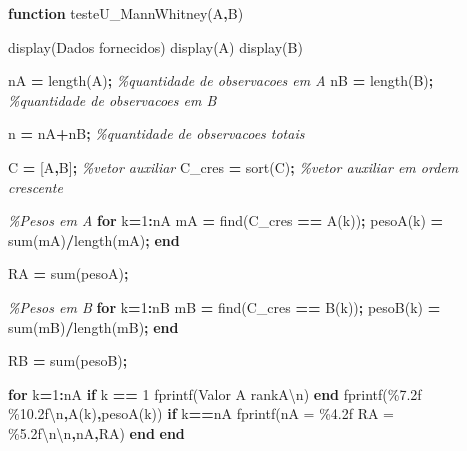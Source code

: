 \documentclass[
]{book}
\newenvironment{Shaded}{\begin{snugshade}}{\end{snugshade}}
\newcommand{\CommentTok}[1]{\textcolor[rgb]{0.56,0.35,0.01}{\textit{#1}}}
\newcommand{\ControlFlowTok}[1]{\textcolor[rgb]{0.13,0.29,0.53}{\textbf{#1}}}
\newcommand{\FloatTok}[1]{\textcolor[rgb]{0.00,0.00,0.81}{#1}}
\newcommand{\FunctionTok}[1]{\textcolor[rgb]{0.00,0.00,0.00}{#1}}
\newcommand{\NormalTok}[1]{#1}
\newcommand{\OperatorTok}[1]{\textcolor[rgb]{0.81,0.36,0.00}{\textbf{#1}}}
\newcommand{\StringTok}[1]{\textcolor[rgb]{0.31,0.60,0.02}{#1}}
\begin{document}
\begin{Shaded}
\begin{Highlighting}[]
\ControlFlowTok{function}\NormalTok{ testeU\_MannWhitney(A}\OperatorTok{,}\NormalTok{B)}

\FunctionTok{display}\NormalTok{(}\StringTok{\textquotesingle{}Dados fornecidos\textquotesingle{}}\NormalTok{)}
\FunctionTok{display}\NormalTok{(A)}
\FunctionTok{display}\NormalTok{(B)}

\NormalTok{nA }\OperatorTok{=} \FunctionTok{length}\NormalTok{(A)}\OperatorTok{;}   \CommentTok{\%quantidade de observacoes em A}
\NormalTok{nB }\OperatorTok{=} \FunctionTok{length}\NormalTok{(B)}\OperatorTok{;}   \CommentTok{\%quantidade de observacoes em B}

\NormalTok{n }\OperatorTok{=}\NormalTok{ nA}\OperatorTok{+}\NormalTok{nB}\OperatorTok{;}        \CommentTok{\%quantidade de observacoes totais}

\NormalTok{C }\OperatorTok{=}\NormalTok{ [A}\OperatorTok{,}\NormalTok{B]}\OperatorTok{;}        \CommentTok{\%vetor auxiliar}
\NormalTok{C\_cres }\OperatorTok{=} \FunctionTok{sort}\NormalTok{(C)}\OperatorTok{;} \CommentTok{\%vetor auxiliar em ordem crescente}

\CommentTok{\%Pesos em A}
\ControlFlowTok{for}\NormalTok{ k}\OperatorTok{=}\FloatTok{1}\OperatorTok{:}\NormalTok{nA}
\NormalTok{  mA }\OperatorTok{=} \FunctionTok{find}\NormalTok{(C\_cres }\OperatorTok{==}\NormalTok{ A(k))}\OperatorTok{;}
\NormalTok{  pesoA(k) }\OperatorTok{=} \FunctionTok{sum}\NormalTok{(mA)}\OperatorTok{/}\FunctionTok{length}\NormalTok{(mA)}\OperatorTok{;}
\ControlFlowTok{end}

\NormalTok{RA }\OperatorTok{=} \FunctionTok{sum}\NormalTok{(pesoA)}\OperatorTok{;}

\CommentTok{\%Pesos em B}
\ControlFlowTok{for}\NormalTok{ k}\OperatorTok{=}\FloatTok{1}\OperatorTok{:}\NormalTok{nB}
\NormalTok{  mB }\OperatorTok{=} \FunctionTok{find}\NormalTok{(C\_cres }\OperatorTok{==}\NormalTok{ B(k))}\OperatorTok{;}
\NormalTok{  pesoB(k) }\OperatorTok{=} \FunctionTok{sum}\NormalTok{(mB)}\OperatorTok{/}\FunctionTok{length}\NormalTok{(mB)}\OperatorTok{;}
\ControlFlowTok{end}

\NormalTok{RB }\OperatorTok{=} \FunctionTok{sum}\NormalTok{(pesoB)}\OperatorTok{;}

\ControlFlowTok{for}\NormalTok{ k}\OperatorTok{=}\FloatTok{1}\OperatorTok{:}\NormalTok{nA}
  \ControlFlowTok{if}\NormalTok{ k }\OperatorTok{==} \FloatTok{1}
    \FunctionTok{fprintf}\NormalTok{(}\StringTok{\textquotesingle{}Valor A           rankA\textbackslash{}n\textquotesingle{}}\NormalTok{)}
  \ControlFlowTok{end}
  \FunctionTok{fprintf}\NormalTok{(}\StringTok{\textquotesingle{}\%7.2f     \%10.2f\textbackslash{}n\textquotesingle{}}\OperatorTok{,}\NormalTok{A(k)}\OperatorTok{,}\NormalTok{pesoA(k))}
  \ControlFlowTok{if}\NormalTok{ k}\OperatorTok{==}\NormalTok{nA}
    \FunctionTok{fprintf}\NormalTok{(}\StringTok{\textquotesingle{}nA = \%4.2f     RA = \%5.2f\textbackslash{}n\textbackslash{}n\textquotesingle{}}\OperatorTok{,}\NormalTok{nA}\OperatorTok{,}\NormalTok{RA)}
  \ControlFlowTok{end}
\ControlFlowTok{end}


\end{Highlighting}
\end{Shaded}
\end{document}
